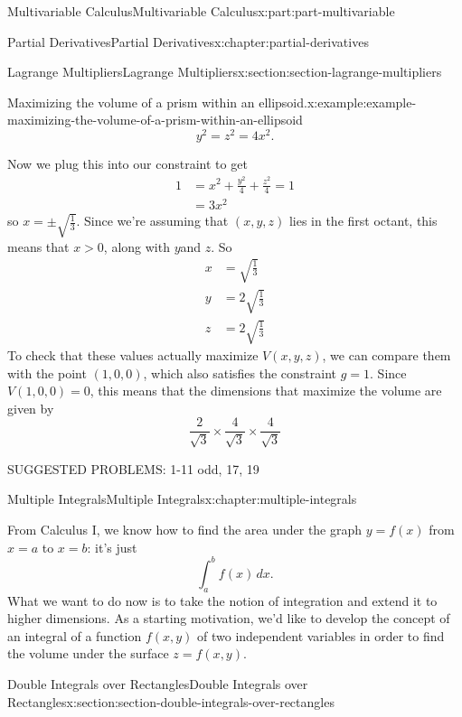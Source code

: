 \documentclass[twoside,10pt,]{book}
\numberwithin{equation}{part}
\begin{document}
\begin{partptx}{Multivariable Calculus}{}{Multivariable Calculus}{}{}{x:part:part-multivariable}
\begin{chapterptx}{Partial Derivatives}{}{Partial Derivatives}{}{}{x:chapter:partial-derivatives}
\begin{sectionptx}{Lagrange Multipliers}{}{Lagrange Multipliers}{}{}{x:section:section-lagrange-multipliers}
\begin{example}{Maximizing the volume of a prism within an ellipsoid.}{x:example:example-maximizing-the-volume-of-a-prism-within-an-ellipsoid}
\begin{equation*}
y^{2} = z^{2} = 4x^{2}.
\end{equation*}
%
\par
Now we plug this into our constraint to get%
\begin{align*}
1 & = x^{2} + \frac{y^{2}}{4} + \frac{z^{2}}{4} = 1 \\
& = 3x^{2} 
\end{align*}
so \(x = \pm\sqrt{\frac{1}{3}}\). Since we're assuming that \((x,y,z)\) lies in the first octant, this means that \(x > 0\), along with \(y \)and \(z\). So%
\begin{align*}
x & = \sqrt{\frac{1}{3}} \\
y & = 2\sqrt{\frac{1}{3}} \\
z & = 2\sqrt{\frac{1}{3}} 
\end{align*}
To check that these values actually maximize \(V(x,y,z)\), we can compare them with the point \((1,0,0)\), which also satisfies the constraint \(g = 1\). Since \(V(1,0,0) = 0\), this means that the dimensions that maximize the volume are given by%
\begin{equation*}
\frac{2}{\sqrt{3}}\times\frac{4}{\sqrt{3}}\times\frac{4}{\sqrt{3}}
\end{equation*}
%
\end{example}
SUGGESTED PROBLEMS: 1-11 odd, 17, 19%
\end{sectionptx}
\end{chapterptx}
%
\typeout{************************************************}
\typeout{************************************************}
%
\begin{chapterptx}{Multiple Integrals}{}{Multiple Integrals}{}{}{x:chapter:multiple-integrals}
\begin{introduction}{}%
From Calculus I, we know how to find the area under the graph \(y = f(x)\) from \(x = a\) to \(x = b\): it's just%
\begin{equation*}
\int_{a}^{b}f(x)\,dx.
\end{equation*}
What we want to do now is to take the notion of integration and extend it to higher dimensions. As a starting motivation, we'd like to develop the concept of an integral of a function \(f(x,y)\) of two independent variables in order to find the volume under the surface \(z = f(x,y)\).%
\end{introduction}%
%
%
\typeout{************************************************}
\typeout{************************************************}
%
\begin{sectionptx}{Double Integrals over Rectangles}{}{Double Integrals over Rectangles}{}{}{x:section:section-double-integrals-over-rectangles}

\end{sectionptx}
\end{chapterptx}
\end{partptx}
\end{document}
